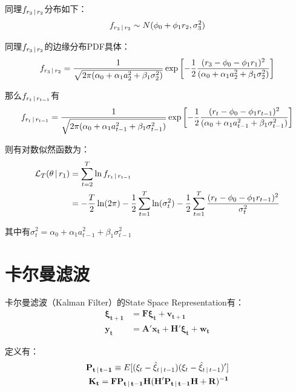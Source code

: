 \documentclass[11pt]{article}
\begin{document}
同理$f_{r_3 \,\vert\, r_2}$分布如下：
\begin{equation*}
    f_{r_3 \,\vert\, r_2} \sim N(\phi_0 + \phi_1 r_2,\sigma_{3}^{2})
\end{equation*}

同理$f_{r_3 \,\vert\, r_2}$的边缘分布PDF具体：
\begin{equation*}
    f_{r_3 \,\vert\, r_2} = \frac{1}{\sqrt{2\pi(\alpha_0 + \alpha_1 a_{2}^{2} + \beta_1 \sigma_{2}^{2})}} \exp \left[ -\frac{1}{2} \frac{(r_3 - \phi_0 -\phi_1 r_1)^2}{(\alpha_0 + \alpha_1 a_{2}^{2} + \beta_1 \sigma_{2}^{2})} \right]
\end{equation*}

那么$f_{r_{t} \,\vert\, r_{t-1}}$有
\begin{equation*}
    f_{r_{t} \,\vert\, r_{t-1}} = \frac{1}{\sqrt{2\pi(\alpha_0 + \alpha_1 a_{t-1}^{2} + \beta_1 \sigma_{t-1}^{2})}} \exp \left[ -\frac{1}{2} \frac{(r_{t} - \phi_0 -\phi_1 r_{t-1})^2}{(\alpha_0 + \alpha_1 a_{t-1}^{2} + \beta_1 \sigma_{t-1}^{2})} \right]
\end{equation*}

则有对数似然函数为：
\begin{align*}
    \mathcal{L}_T(\theta \,\vert\, r_1) &= \sum_{t=2}^{T} \ln f_{r_{t} \,\vert\, r_{t-1}} \\
    &= -\frac{T}{2}\ln(2\pi) - \frac{1}{2} \sum_{t=1}^{T} \ln(\sigma_{t}^{2}) - \frac{1}{2} \sum_{t=1}^{T} \frac{(r_{t} - \phi_0 -\phi_1 r_{t-1})^2}{\sigma_{t}^{2}}
\end{align*}

其中有$\sigma_t^2 = \alpha_0 + \alpha_1 a_{t-1}^{2} + \beta_1 \sigma_{t-1}^{2}$

\section{卡尔曼滤波}

卡尔曼滤波（Kalman Filter）的State Space Representation有：
\begin{align*}
   \mathbf{\xi_{t+1}} &= \mathbf{F \xi_{t}} + \mathbf{v_{t+1}} \\
   \mathbf{y_{t}} &= \mathbf{A'} \mathbf{x_{t}} + \mathbf{H'\xi_{t}} + \mathbf{w_t}
\end{align*}

定义有：
\begin{align*}
    \mathbf{P_{t\,\vert\, t-1}} \equiv E[(\xi_{t} - \hat{\xi}_{t\,\vert\, t-1})(\xi_{t} - \hat{\xi}_{t\,\vert\, t-1})'] \\
    \mathbf{K_t} = \mathbf{FP_{t\,\vert\, t-1}H(H'P_{t\,\vert\, t-1}H+R)^{-1}}
\end{align*}
\end{document}
